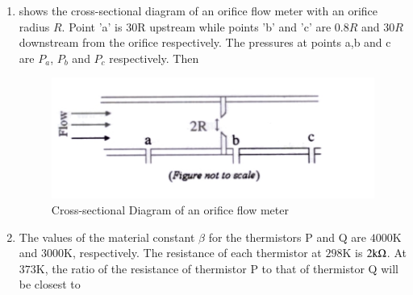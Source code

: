 \documentclass[journal,12pt,onecolumn]{IEEEtran}
\theoremstyle{remark}
\begin{document}
\begin{enumerate}
 
\item {} shows the cross-sectional diagram of an orifice flow meter with an orifice radius $R$. Point 'a' is $30\mathrm{R}$ upstream while points 'b' and 'c' are $0.8R$ and $30R$ downstream from the orifice respectively. The pressures at points a,b and c are $P_a$, $P_b$ and $P_c$ respectively. Then \par \hfill{}
\begin{figure}[H]
    \centering
    \includegraphics[width=0.5\columnwidth]{Figs/Q-30.jpg}
    \caption{Cross-sectional Diagram of an orifice flow meter}
    \label{fig:placeholder_7}
\end{figure}

\begin{enumerate}
\end{enumerate}

 
\item The values of the material constant $\beta$ for the thermistors P and Q are $4000\text{K}$ and $3000\text{K}$, respectively. The resistance of each thermistor at $298\text{K}$ is $2\text{k}\ohm$. At $373\text{K}$, the ratio of the resistance of thermistor P to that of thermistor Q will be closest to \par \hfill{}
\begin{enumerate}
\end{enumerate}


\end{enumerate}
\end{document}
